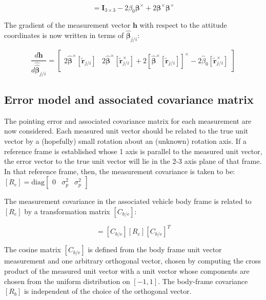 \documentclass{aiaa-tc}
\newcommand{\B}[1]{\textbf{#1}} %
\newcommand{\BG}[1]{{\bm #1}}           %
\newcommand{\ddarg}[2]{\frac{d#1}{d#2}} %
\begin{document}
\begin{equation}
[C_{j/i}(\BG{\beta}_{j/i})] = \B{I}_{3 \times 3} - 2\beta_0 \BG{\beta}^\times + 2\BG{\beta}^\times\BG{\beta}^\times
\end{equation}

The gradient of the measurement vector $\B{h}$ with respect to the attitude coordinates is now written in terms of $\hat{\BG{\beta}}_{j/i}$:

\begin{equation}
\ddarg{\B{h}}{\hat{\hat{\BG{\beta}}}_{j/i}} = \begin{bmatrix}
2\hat{\BG{\beta}}^\times [\tilde{\B{r}}_{j/i}] & 2\hat{\BG{\beta}}^\times[\tilde{\B{r}}_{j/i}^\times] + 2[\hat{\BG{\beta}}^\times [\tilde{\B{r}}_{j/i}]]^\times - 2\hat{\beta}_0 [\tilde{\B{r}}_{j/i}^\times]
\end{bmatrix}
\label{eq:HlinDef}
\end{equation}

\subsection{Error model and associated covariance matrix}
\label{sec:pointingErrorModel}

The pointing error and associated covariance matrix for each measurement are now considered. Each measured unit vector should be related to the true unit vector by a (hopefully) small rotation about an (unknown) rotation axis. If a reference frame is established whose 1 axis is parallel to the measured unit vector, the error vector to the true unit vector will lie in the 2-3 axis plane of that frame. In that reference frame, then, the measurement covariance is taken to be: $[R_e] = \mathrm{diag} \begin{bmatrix} 0 & \sigma_p^2 & \sigma_p^2
\end{bmatrix}$

The measurement covariance in the associated vehicle body frame is related to $[R_e]$ by a transformation matrix $[C_{b/e}]$:

\begin{equation}
[R_b] = [C_{b/e}][R_e][C_{b/e}]^T
\end{equation}

The cosine matrix $[C_{b/e}]$ is defined from the body frame unit vector measurement and one arbitrary orthogonal vector, chosen by computing the cross product of the measured unit vector with a unit vector whose components are chosen from the uniform distribution on $[-1,1]$. The body-frame covariance $[R_b]$ is independent of the choice of the orthogonal vector.
\end{document}
